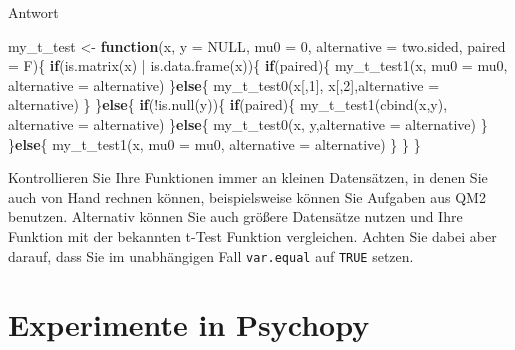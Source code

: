 \documentclass[
]{book}
\newenvironment{Shaded}{\begin{snugshade}}{\end{snugshade}}
\newcommand{\AttributeTok}[1]{\textcolor[rgb]{0.77,0.63,0.00}{#1}}
\newcommand{\ConstantTok}[1]{\textcolor[rgb]{0.00,0.00,0.00}{#1}}
\newcommand{\ControlFlowTok}[1]{\textcolor[rgb]{0.13,0.29,0.53}{\textbf{#1}}}
\newcommand{\DecValTok}[1]{\textcolor[rgb]{0.00,0.00,0.81}{#1}}
\newcommand{\FunctionTok}[1]{\textcolor[rgb]{0.00,0.00,0.00}{#1}}
\newcommand{\NormalTok}[1]{#1}
\newcommand{\OtherTok}[1]{\textcolor[rgb]{0.56,0.35,0.01}{#1}}
\newcommand{\SpecialCharTok}[1]{\textcolor[rgb]{0.00,0.00,0.00}{#1}}
\newcommand{\StringTok}[1]{\textcolor[rgb]{0.31,0.60,0.02}{#1}}
\begin{document}
Antwort

\begin{Shaded}
\begin{Highlighting}[]
\NormalTok{my\_t\_test }\OtherTok{\textless{}{-}} \ControlFlowTok{function}\NormalTok{(x,}
                      \AttributeTok{y =} \ConstantTok{NULL}\NormalTok{,}
                      \AttributeTok{mu0 =} \DecValTok{0}\NormalTok{,}
                      \AttributeTok{alternative =} \StringTok{\textquotesingle{}two.sided\textquotesingle{}}\NormalTok{, }
                      \AttributeTok{paired =}\NormalTok{ F)\{}
  \ControlFlowTok{if}\NormalTok{(}\FunctionTok{is.matrix}\NormalTok{(x) }\SpecialCharTok{|} \FunctionTok{is.data.frame}\NormalTok{(x))\{}
    \ControlFlowTok{if}\NormalTok{(paired)\{}
      \FunctionTok{my\_t\_test1}\NormalTok{(x, }\AttributeTok{mu0 =}\NormalTok{ mu0, }\AttributeTok{alternative =}\NormalTok{ alternative)}
\NormalTok{    \}}\ControlFlowTok{else}\NormalTok{\{}
      \FunctionTok{my\_t\_test0}\NormalTok{(x[,}\DecValTok{1}\NormalTok{], x[,}\DecValTok{2}\NormalTok{],}\AttributeTok{alternative =}\NormalTok{ alternative)}
\NormalTok{    \}}
\NormalTok{  \}}\ControlFlowTok{else}\NormalTok{\{}
    \ControlFlowTok{if}\NormalTok{(}\SpecialCharTok{!}\FunctionTok{is.null}\NormalTok{(y))\{}
      \ControlFlowTok{if}\NormalTok{(paired)\{}
        \FunctionTok{my\_t\_test1}\NormalTok{(}\FunctionTok{cbind}\NormalTok{(x,y), }\AttributeTok{alternative =}\NormalTok{ alternative)}
\NormalTok{      \}}\ControlFlowTok{else}\NormalTok{\{}
        \FunctionTok{my\_t\_test0}\NormalTok{(x, y,}\AttributeTok{alternative =}\NormalTok{ alternative)}
\NormalTok{      \}}
\NormalTok{    \}}\ControlFlowTok{else}\NormalTok{\{}
      \FunctionTok{my\_t\_test1}\NormalTok{(x, }\AttributeTok{mu0 =}\NormalTok{ mu0, }\AttributeTok{alternative =}\NormalTok{ alternative)}
\NormalTok{    \}}
\NormalTok{  \}}
\NormalTok{\}}
\end{Highlighting}
\end{Shaded}

Kontrollieren Sie Ihre Funktionen immer an kleinen Datensätzen, in denen Sie auch von Hand rechnen können, beispielsweise können Sie Aufgaben aus QM2 benutzen.
Alternativ können Sie auch größere Datensätze nutzen und Ihre Funktion mit der bekannten t-Test Funktion vergleichen. Achten Sie dabei aber darauf, dass Sie im unabhängigen Fall \texttt{var.equal} auf \texttt{TRUE} setzen.

\hypertarget{experimente-in-psychopy}{%
\chapter{Experimente in Psychopy}\label{experimente-in-psychopy}}
\end{document}
